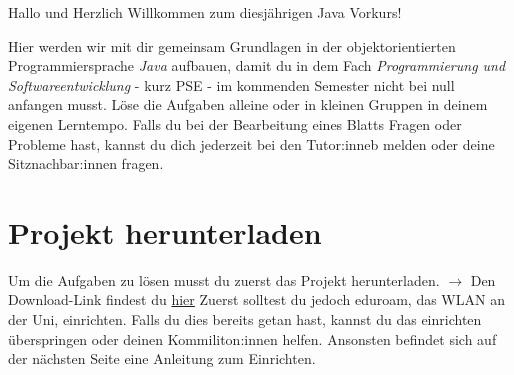 \begin{center}
	Hallo und Herzlich Willkommen zum diesjährigen Java Vorkurs!\\
\end{center}
Hier werden wir mit dir gemeinsam Grundlagen in der objektorientierten Programmiersprache \textit{Java} aufbauen, damit du in dem Fach \textit{Programmierung und Softwareentwicklung} - kurz PSE - im kommenden Semester nicht bei null anfangen musst.\newline
Löse die Aufgaben alleine oder in kleinen Gruppen in deinem eigenen Lerntempo.\newline
Falls du bei der Bearbeitung eines Blatts Fragen oder Probleme hast, kannst du dich jederzeit bei den Tutor:inneb melden oder deine Sitznachbar:innen fragen.\newline

\section*{Projekt herunterladen}
Um die Aufgaben zu lösen musst du zuerst das Projekt herunterladen.\newline
$\rightarrow$ Den Download-Link findest du \href{\jvkpackageurl}{hier}\newline
Zuerst solltest du jedoch eduroam, das WLAN an der Uni, einrichten. 
Falls du dies bereits getan hast, kannst du das einrichten überspringen oder deinen Kommiliton:innen helfen. 
Ansonsten befindet sich auf der nächsten Seite eine Anleitung zum Einrichten.
\newpage
